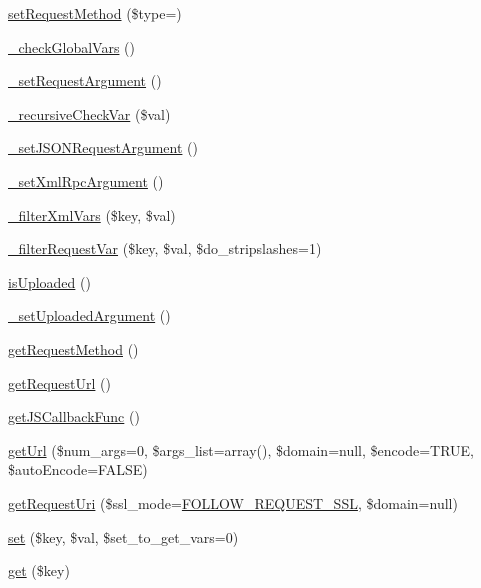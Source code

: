 \begin{DoxyCompactItemize}
\item 
\hyperlink{classContext_afe9abd67c51e0ecc07cf29bf23102926}{set\+Request\+Method} (\$type=\textquotesingle{}\textquotesingle{})
\item 
\hyperlink{classContext_a8030f7c76467bfcec812be76f55571cd}{\+\_\+check\+Global\+Vars} ()
\item 
\hyperlink{classContext_acfc274753d9687732458bfaba540c120}{\+\_\+set\+Request\+Argument} ()
\item 
\hyperlink{classContext_aae89f13e0d99577a6cb8a3bac584cee1}{\+\_\+recursive\+Check\+Var} (\$val)
\item 
\hyperlink{classContext_ae07924273ca1b17fe67a7cf978d762fc}{\+\_\+set\+J\+S\+O\+N\+Request\+Argument} ()
\item 
\hyperlink{classContext_abaa9eeef192a9e4b48a06d0af9b1fd05}{\+\_\+set\+Xml\+Rpc\+Argument} ()
\item 
\hyperlink{classContext_a8104d3bb19322baf793f4a3cc0aad078}{\+\_\+filter\+Xml\+Vars} (\$key, \$val)
\item 
\hyperlink{classContext_a3c411bc0bf786b605af4a7af8ad3ee53}{\+\_\+filter\+Request\+Var} (\$key, \$val, \$do\+\_\+stripslashes=1)
\item 
\hyperlink{classContext_a65ee4d61d0211c8a3f0eeb4251c85892}{is\+Uploaded} ()
\item 
\hyperlink{classContext_a9c821f96670ef47c7139bafc6b39091b}{\+\_\+set\+Uploaded\+Argument} ()
\item 
\hyperlink{classContext_a6912ff86e08ef782a296b77ff1307481}{get\+Request\+Method} ()
\item 
\hyperlink{classContext_ace7f220a4d945de0172f0c1fc98fe31e}{get\+Request\+Url} ()
\item 
\hyperlink{classContext_ab2e157a87d2b960d78b2c3f35ae7da23}{get\+J\+S\+Callback\+Func} ()
\item 
\hyperlink{classContext_aa60b75d32d4923bb3b9854985a82ce36}{get\+Url} (\$num\+\_\+args=0, \$args\+\_\+list=array(), \$domain=null, \$encode=T\+R\+UE, \$auto\+Encode=F\+A\+L\+SE)
\item 
\hyperlink{classContext_aa79578cfccee4d7f7c4890dc6e36ff90}{get\+Request\+Uri} (\$ssl\+\_\+mode=\hyperlink{Context_8class_8php_a546ef85538017b41b2928e818066989d}{F\+O\+L\+L\+O\+W\+\_\+\+R\+E\+Q\+U\+E\+S\+T\+\_\+\+S\+SL}, \$domain=null)
\item 
\hyperlink{classContext_a9f79aa7aecf2e4d8006e517844523fc2}{set} (\$key, \$val, \$set\+\_\+to\+\_\+get\+\_\+vars=0)
\item 
\hyperlink{classContext_a90ce25d65fe6c9778421cbb36ab3def5}{get} (\$key)

\end{DoxyCompactItemize}

